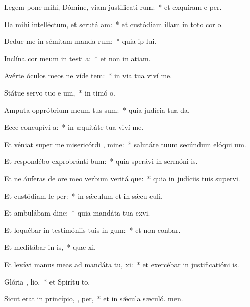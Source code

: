 \item Legem pone mihi, Dómine, viam justificati rum:~* et exquíram e per.
\item Da mihi intelléctum, et scrutá  am:~* et custódiam illam in toto cor o.
\item Deduc me in sémitam manda rum:~* quia ip lui.
\item Inclína cor meum in testi a:~* et non in atiam.
\item Avérte óculos meos ne víde tem:~* in via tua viví me.
\item Státue servo tuo e um,~* in timó o.
\item Amputa oppróbrium meum  tus sum:~* quia judícia tua da.
\item Ecce concupívi  a:~* in æquitáte tua viví me.
\item Et véniat super me misericórdi , mine:~* salutáre tuum secúndum elóqui um.
\item Et respondébo exprobránti  bum:~* quia sperávi in sermóni is.
\item Et ne áuferas de ore meo verbum veritá que:~* quia in judíciis tuis supervi.
\item Et custódiam le  per:~* in sǽculum et in sǽcu culi.
\item Et ambulábam  dine:~* quia mandáta tua exvi.
\item Et loquébar in testimóniis tuis in  gum:~* et non conbar.
\item Et meditábar in  is,~* quæ xi.
\item Et levávi manus meas ad mandáta tu,  xi:~* et exercébar in justificatióni is.
\item Glória ,  lio,~* et Spirítu to.
\item Sicut erat in princípio,  ,  per,~* et in sǽcula sæculó. men.
